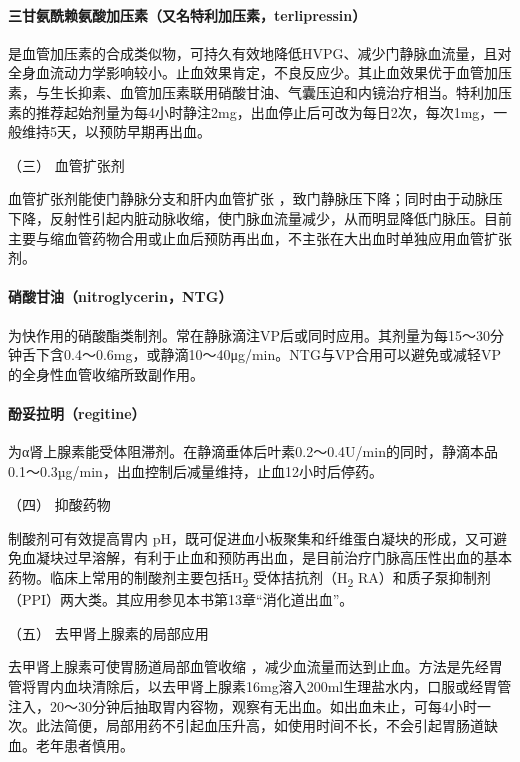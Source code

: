 \paragraph{三甘氨酰赖氨酸加压素（又名特利加压素，terlipressin）}

是血管加压素的合成类似物，可持久有效地降低HVPG、减少门静脉血流量，且对全身血流动力学影响较小。止血效果肯定，不良反应少。其止血效果优于血管加压素，与生长抑素、血管加压素联用硝酸甘油、气囊压迫和内镜治疗相当。特利加压素的推荐起始剂量为每4小时静注2mg，出血停止后可改为每日2次，每次1mg，一般维持5天，以预防早期再出血。

\hypertarget{text00328.htmlux5cux23CHP11-7-1-3-2-3}{}
（三） 血管扩张剂

血管扩张剂能使门静脉分支和肝内血管扩张
，致门静脉压下降；同时由于动脉压下降，反射性引起内脏动脉收缩，使门脉血流量减少，从而明显降低门脉压。目前主要与缩血管药物合用或止血后预防再出血，不主张在大出血时单独应用血管扩张剂。

\paragraph{硝酸甘油（nitroglycerin，NTG）}

为快作用的硝酸酯类制剂。常在静脉滴注VP后或同时应用。其剂量为每15～30分钟舌下含0.4～0.6mg，或静滴10～40μg/min。NTG与VP合用可以避免或减轻VP的全身性血管收缩所致副作用。

\paragraph{酚妥拉明（regitine）}

为α肾上腺素能受体阻滞剂。在静滴垂体后叶素0.2～0.4U/min的同时，静滴本品0.1～0.3µg/min，出血控制后减量维持，止血12小时后停药。

\hypertarget{text00328.htmlux5cux23CHP11-7-1-3-2-4}{}
（四） 抑酸药物

制酸剂可有效提高胃内
pH，既可促进血小板聚集和纤维蛋白凝块的形成，又可避免血凝块过早溶解，有利于止血和预防再出血，是目前治疗门脉高压性出血的基本药物。临床上常用的制酸剂主要包括H\textsubscript{2}
受体拮抗剂（H\textsubscript{2}
RA）和质子泵抑制剂（PPI）两大类。其应用参见本书第13章“消化道出血”。

\hypertarget{text00328.htmlux5cux23CHP11-7-1-3-2-5}{}
（五） 去甲肾上腺素的局部应用

去甲肾上腺素可使胃肠道局部血管收缩
，减少血流量而达到止血。方法是先经胃管将胃内血块清除后，以去甲肾上腺素16mg溶入200ml生理盐水内，口服或经胃管注入，20～30分钟后抽取胃内容物，观察有无出血。如出血未止，可每4小时一次。此法简便，局部用药不引起血压升高，如使用时间不长，不会引起胃肠道缺血。老年患者慎用。


